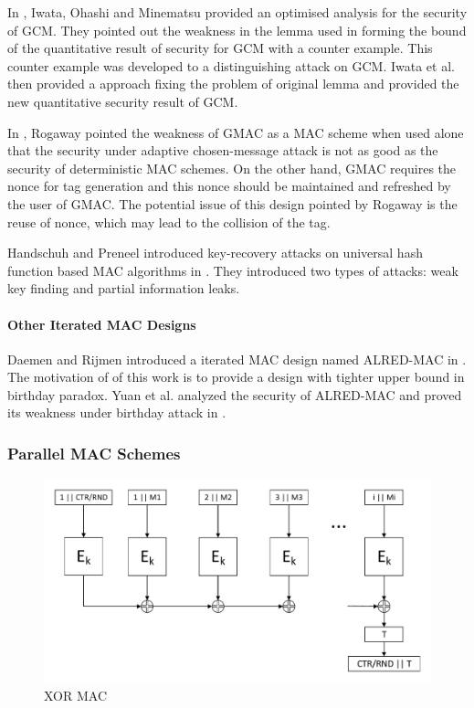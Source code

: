 \documentclass{article}
\begin{document}
In \cite{breaking}, Iwata, Ohashi and Minematsu provided an optimised analysis for the security of GCM. They pointed out the weakness in the lemma used in forming the bound of the quantitative result of security for GCM with a counter example. This counter example was developed to a distinguishing attack on GCM. Iwata et al. then provided a approach fixing the problem of original lemma and provided the new quantitative security result of GCM. 

In \cite{Rogaway2011}, Rogaway pointed the weakness of GMAC as a MAC scheme when used alone that the security under adaptive chosen-message attack is not as good as the security of deterministic MAC schemes. On the other hand, GMAC requires the nonce for tag generation and this nonce should be maintained and refreshed by the user of GMAC. The potential issue of this design pointed by Rogaway is the reuse of nonce, which may lead to the collision of the tag. 

Handschuh and Preneel introduced key-recovery attacks on universal hash function based MAC algorithms in \cite{key_recover}. They introduced two types of attacks: weak key finding and partial information leaks.

\paragraph{Other Iterated MAC Designs}
Daemen and Rijmen introduced a iterated MAC design named ALRED-MAC in \cite{alred}. The motivation of of this work is to provide a design with tighter upper bound in birthday paradox. Yuan et al. analyzed the security of ALRED-MAC and proved its weakness under birthday attack in \cite{yuan2009new}. 

\subsubsection{Parallel MAC Schemes}
\begin{figure}[htbp]
\centering
\includegraphics[scale=0.5]{./diagrams/XOR-MAC.pdf}
\caption{XOR MAC}
\label{fig:XOR-MAC}
\end{figure}
\end{document}
